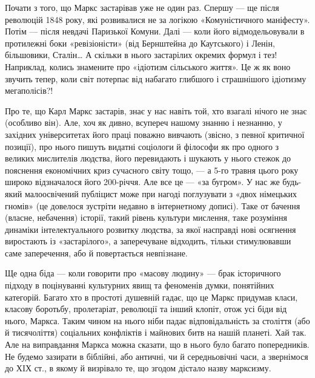 
Почати з того, що Маркс застарівав уже не один раз. Спершу — ще після 
революцій 1848 року, які розвивалися не за логікою «Комуністичного 
маніфесту». Потім — після невдачі Паризької Комуни. Далі — коли його 
відмодельовували в протилежні боки «ревізіоністи» (від Бернштейна до 
Каутського) і Ленін, більшовики, Сталін\ldots{} А скільки в нього 
застарілих окремих формул і тез! Наприклад, колись знамените про 
«ідіотизм сільського життя». Це ж як воно звучить тепер, коли світ 
потерпає від набагато глибшого і страшнішого ідіотизму мегаполісів?!


Про те, що Карл Маркс застарів, знає у нас навіть той, хто взагалі 
нічого не знає (особливо він). Але, хоч як дивно, всупереч нашому знанню 
і незнанню, у західних університетах його праці поважно вивчають 
(звісно, з певної критичної позиції), про нього пишуть видатні 
соціологи й філософи як про одного з великих мислителів людства, його 
перевидають і шукають у нього стежок до пояснення економічних криз 
сучасного світу тощо, — а 5-го травня цього року широко відзначалося 
його 200-річчя. Але все це — «за бугром». У нас же будь-який 
малоосвічений публіцист може при нагоді поглузувати з «двох 
німецьких гномів» (це довелося зустріти недавно в інтернетному 
дописі). Таке от бачення (власне, небачення) історії, такий рівень 
культури мислення, таке розуміння динаміки інтелектуального розвитку 
людства, за якої насправді нові осягнення виростають із 
«застарілого», а заперечуване відходить, тільки стимулювавши саме 
заперечення, або й повертається невпізнане.


Ще одна біда — коли говорити про «масову людину» — брак історичного 
підходу в поцінуванні культурних явищ та феноменів думки, понятійних 
категорій. Багато хто в простоті душевній гадає, що це Маркс придумав 
класи, класову боротьбу, пролетаріат, революції та інший клопіт, отож 
усі біди від нього, Маркса. Таким чином на нього ніби падає 
відповідальність за століття (або й тисячоліття) соціальних 
конфліктів і майнових битв на нашій планеті. Хай так. Але на 
виправдання Маркса можна сказати, що в нього було багато попередників. 
Не будемо зазирати в біблійні, або античні, чи й середньовічні часи, а 
звернімося до ХIХ ст., в якому й визрівало те, що згодом дістало назву 
марксизму.

